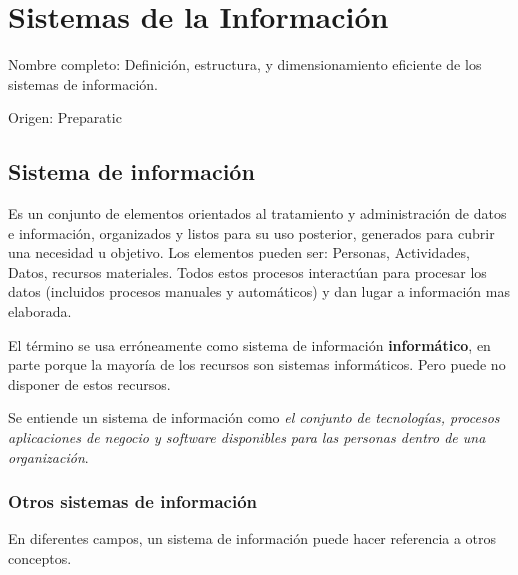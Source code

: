 \setcounter{section}{27}
\section{Sistemas de la Información}

Nombre completo: Definición, estructura, y dimensionamiento eficiente de los sistemas de información.

Origen: Preparatic
\localtableofcontents

\subsection{Sistema de información}
Es un conjunto de elementos orientados al tratamiento y administración de datos e información, organizados y listos para su uso posterior, generados para cubrir una necesidad u objetivo. Los elementos pueden ser: Personas, Actividades, Datos, recursos materiales. Todos estos procesos interactúan para procesar los datos (incluidos procesos manuales y automáticos) y dan lugar a información mas elaborada. 

El término se usa erróneamente como sistema de información \textbf{informático}, en parte porque la mayoría de los recursos son sistemas informáticos. Pero puede no disponer de estos recursos.

Se entiende un sistema de información como \textit{el conjunto de tecnologías, procesos aplicaciones de negocio y software disponibles para las personas dentro de una organización}.

\subsubsection{Otros sistemas de información}

En diferentes campos, un sistema de información puede hacer referencia a otros conceptos.

